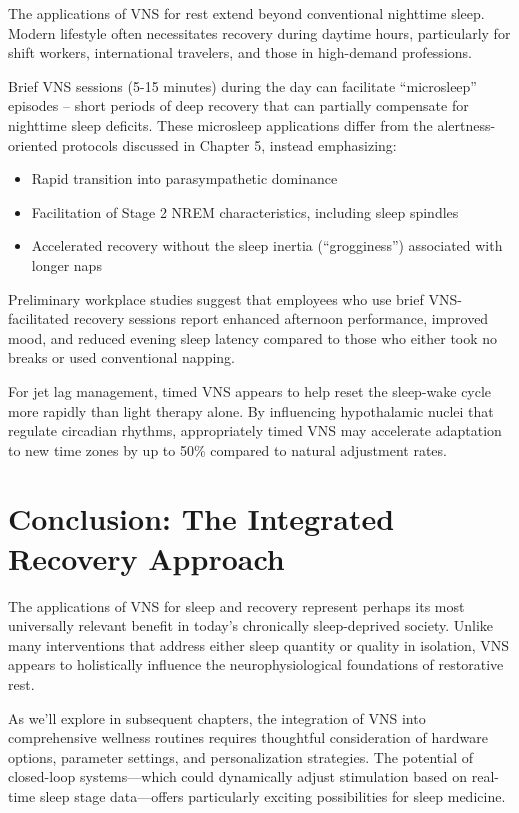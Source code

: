 \documentclass[
  Letterpaper,
]{scrbook}
\providecommand{\tightlist}{%
  \setlength{\itemsep}{0pt}\setlength{\parskip}{0pt}}\usepackage{longtable,booktabs,array}
\begin{document}
The applications of VNS for rest extend beyond conventional nighttime
sleep. Modern lifestyle often necessitates recovery during daytime
hours, particularly for shift workers, international travelers, and
those in high-demand professions.

Brief VNS sessions (5-15 minutes) during the day can facilitate
``microsleep'' episodes -- short periods of deep recovery that can
partially compensate for nighttime sleep deficits. These microsleep
applications differ from the alertness-oriented protocols discussed in
Chapter 5, instead emphasizing:

\begin{itemize}
\tightlist
\item
  Rapid transition into parasympathetic dominance
\item
  Facilitation of Stage 2 NREM characteristics, including sleep spindles
\item
  Accelerated recovery without the sleep inertia (``grogginess'')
  associated with longer naps
\end{itemize}

Preliminary workplace studies suggest that employees who use brief
VNS-facilitated recovery sessions report enhanced afternoon performance,
improved mood, and reduced evening sleep latency compared to those who
either took no breaks or used conventional napping.

For jet lag management, timed VNS appears to help reset the sleep-wake
cycle more rapidly than light therapy alone. By influencing hypothalamic
nuclei that regulate circadian rhythms, appropriately timed VNS may
accelerate adaptation to new time zones by up to 50\% compared to
natural adjustment rates.

\section{Conclusion: The Integrated Recovery
Approach}\label{conclusion-the-integrated-recovery-approach}

The applications of VNS for sleep and recovery represent perhaps its
most universally relevant benefit in today's chronically sleep-deprived
society. Unlike many interventions that address either sleep quantity or
quality in isolation, VNS appears to holistically influence the
neurophysiological foundations of restorative rest.

As we'll explore in subsequent chapters, the integration of VNS into
comprehensive wellness routines requires thoughtful consideration of
hardware options, parameter settings, and personalization strategies.
The potential of closed-loop systems---which could dynamically adjust
stimulation based on real-time sleep stage data---offers particularly
exciting possibilities for sleep medicine.
\end{document}
